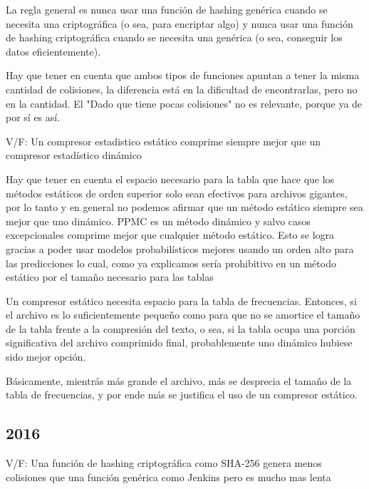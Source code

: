 \documentclass[a4paper]{article}
\newenvironment{enunciado}[3]{%
    \vspace{\baselineskip}
    \tcolorbox[beamer,%
    noparskip,breakable,
    colback=LightGreen,colframe=DarkGreen,%
    colbacklower=LimeGreen!75!LightGreen,%
    title=\small Enunciado: Año #1\, Cuatrimestre #2\, Oportunidad #3]}%
    {\endtcolorbox}
\newenvironment{criterio}[3]{%
    \tcolorbox[beamer,%
    noparskip,breakable,
    colback=LightCoral,colframe=DarkRed,%
    colbacklower=Tomato!75!LightCoral,%
    title=\small Criterio de Corrección: Año #1\, Cuatrimestre #2\, Oportunidad #3]}%
    {\endtcolorbox}
\begin{document}
    La regla general es nunca usar una función de hashing genérica cuando se necesita una criptográfica (o sea, para encriptar algo) y nunca usar una función de hashing criptográfica cuando se necesita una genérica (o sea, conseguir los datos eficientemente).

    Hay que tener en cuenta que ambos tipos de funciones apuntan a tener la misma cantidad de colisiones, la diferencia está en la dificultad de encontrarlas, pero no en la cantidad. El  "Dado que tiene pocas colisiones" no es relevante, porque ya de por sí es así.

    \begin{enunciado}{2015}{1}{1}
        V/F: Un   compresor   estadistico estático   comprime   siempre mejor   que   un   compresor estadístico   dinámico
    \end{enunciado}

    \begin{criterio}{2015}{1}{1}
        Hay que tener en cuenta el espacio necesario para la tabla que hace que los métodos estáticos de orden superior solo sean efectivos para archivos gigantes, por lo tanto y en general no podemos afirmar que un método estático siempre sea mejor que uno dinámico. PPMC es un método dinámico y salvo casos excepcionales comprime mejor que cualquier método estático. Esto se logra   gracias   a   poder   usar   modelos   probabilísticos   mejores   usando   un   orden   alto   para   las   predicciones   lo   cual,   como   ya explicamos sería prohibitivo en un método estático por el tamaño necesario para las tablas
    \end{criterio}

    Un compresor estático necesita espacio para la tabla de frecuencias. Entonces, si el archivo es lo suficientemente pequeño como para que no se amortice el tamaño de la tabla frente a la compresión del texto, o sea, si la tabla ocupa una porción significativa del archivo comprimido final, probablemente uno dinámico hubiese sido mejor opción.

    Básicamente, mientrás más grande el archivo, más se desprecia el tamaño de la tabla de frecuencias, y por ende más se justifica el uso de un compresor estático.

    \subsection{2016}

    \begin{enunciado}{2016}{2}{1}
        V/F: Una   función   de   hashing criptográfica   como   SHA-256 genera menos colisiones que una función   genérica   como   Jenkins pero es mucho mas lenta
    \end{enunciado}
\end{document}
